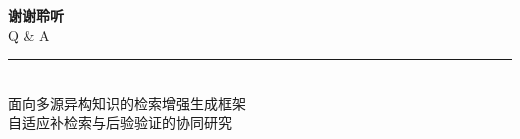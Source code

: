 
\begin{frame}[plain]{}
  \centering
  \vspace{2em}
  {\Huge\bfseries\color{ZjuBlue} 谢谢聆听}\\[1.2em]
  {\Large\color{SoftGray} Q \& A}\\[2em]
  {\color{ZjuRed}\rule{0.42\linewidth}{1.4pt}}\\[1.5em]
  {\small\color{SoftGray} 面向多源异构知识的检索增强生成框架\\[0.3em]
  自适应补检索与后验验证的协同研究}
\end{frame}

